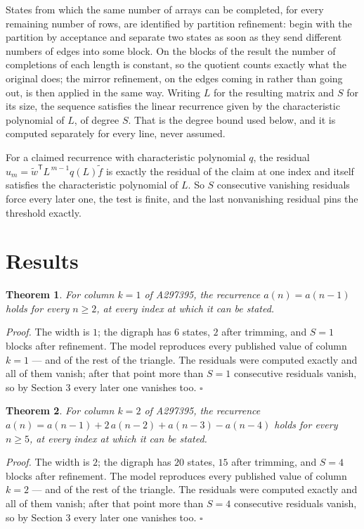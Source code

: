 \documentclass[11pt]{article}
\newtheorem{theorem}{Theorem}
\theoremstyle{definition}
\begin{document}
States from which the same number of arrays can be completed, for every remaining number of rows, are identified by partition refinement: begin with the partition by acceptance and separate two states as soon as they send different numbers of edges into some block. On the blocks of the result the number of completions of each length is constant, so the quotient counts exactly what the original does; the mirror refinement, on the edges coming in rather than going out, is then applied in the same way. Writing $L$ for the resulting matrix and $S$ for its size, the sequence satisfies the linear recurrence given by the characteristic polynomial of $L$, of degree $S$. That is the degree bound used below, and it is computed separately for every line, never assumed.

For a claimed recurrence with characteristic polynomial $q$, the residual $u_m = \tilde w^{\mathsf T}L^{\,m-1}q(L)\tilde f$ is exactly the residual of the claim at one index and itself satisfies the characteristic polynomial of $L$. So $S$ consecutive vanishing residuals force every later one, the test is finite, and the last nonvanishing residual pins the threshold exactly.

\section{Results}

\begin{theorem} For column $k = 1$ of A297395, the recurrence $a(n) = a(n-1)$ holds for every $n \ge 2$, at every index at which it can be stated.\end{theorem}

{\itshape Proof.} The width is $1$; the digraph has $6$ states, $2$ after trimming, and $S = 1$ blocks after refinement. The model reproduces every published value of column $k = 1$ --- and of the rest of the triangle. The residuals were computed exactly and all of them vanish; after that point more than $S = 1$ consecutive residuals vanish, so by Section 3 every later one vanishes too. $\square$

\begin{theorem} For column $k = 2$ of A297395, the recurrence $a(n) = a(n-1) + 2\,a(n-2) + a(n-3) - a(n-4)$ holds for every $n \ge 5$, at every index at which it can be stated.\end{theorem}

{\itshape Proof.} The width is $2$; the digraph has $20$ states, $15$ after trimming, and $S = 4$ blocks after refinement. The model reproduces every published value of column $k = 2$ --- and of the rest of the triangle. The residuals were computed exactly and all of them vanish; after that point more than $S = 4$ consecutive residuals vanish, so by Section 3 every later one vanishes too. $\square$
\end{document}
